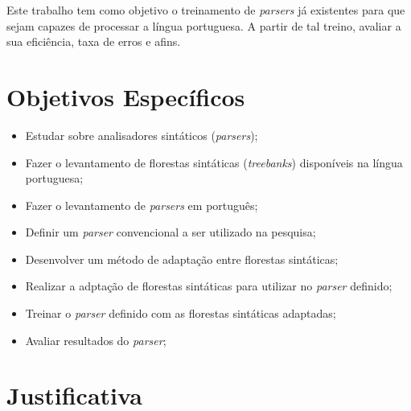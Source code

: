 
Este trabalho tem como objetivo o treinamento de \textit{parsers} já existentes para que sejam capazes de processar a língua portuguesa. A partir de tal treino, avaliar a sua eficiência, taxa de erros e afins.

\section{Objetivos Específicos}
\label{sec:objetivos-especificos}
\begin{itemize}
    \item Estudar sobre analisadores sintáticos (\textit{parsers});
    \item Fazer o levantamento de florestas sintáticas (\textit{treebanks}) disponíveis na língua portuguesa;
    \item Fazer o levantamento de \textit{parsers} em português;
    \item Definir um \textit{parser} convencional a ser utilizado na pesquisa;
    \item Desenvolver um método de adaptação entre florestas sintáticas; 
    \item Realizar a adptação de florestas sintáticas para utilizar no \textit{parser} definido;
    \item Treinar o \textit{parser} definido com as florestas sintáticas adaptadas;
    \item Avaliar resultados do \textit{parser};
    
\end{itemize}

\section{Justificativa}	
\label{justificativa}



